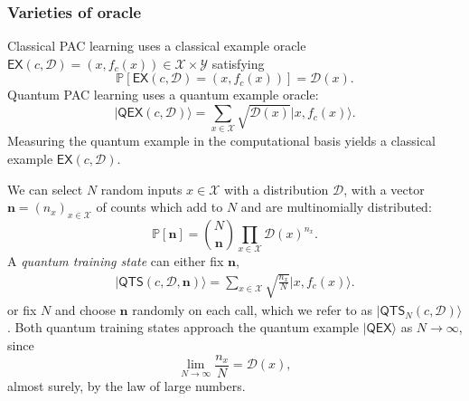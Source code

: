 \documentclass[aps, pre,reprint,nofootinbib,citeautoscript,floatfix]{revtex4-1}
\begin{document}
\subsubsection*{Varieties of oracle}
\label{sec:varieties-oracle}

Classical PAC learning uses a classical example oracle $\mathsf{EX}(c,
\mathcal{D}) = (x, f_c(x)) \in \mathcal{X}\times \mathcal{Y}$ satisfying
\begin{equation}
  \mathbb{P}[\mathsf{EX}(c, \mathcal{D}) = (x, f_c(x))] = \mathcal{D}(x).
\end{equation}
Quantum PAC learning uses a quantum example oracle:
\begin{equation}
  \label{eq:qex2}
  \big|\mathsf{QEX}(c, {\mathcal{D}})\big\rangle = \sum_{x\in
    \mathcal{X}}\sqrt{\mathcal{D}(x)}|x, f_c(x)\rangle.
\end{equation}
Measuring the quantum example in the computational basis yields a classical
example $\mathsf{EX}(c, \mathcal{D})$.

We can select $N$ random inputs $x\in \mathcal{X}$ with a
distribution $\mathcal{D}$, with a vector $\mathbf{n} = (n_x)_{x\in
  \mathcal{X}}$ of counts which add to $N$ and are multinomially distributed:
  \begin{equation}
\mathbb{P}[\mathbf{n}] =
  \binom{N}{\mathbf{n}}\prod_{x\in\mathcal{X}} \mathcal{D}(x)^{n_x}.\label{eq:88}
\end{equation}
A \emph{quantum training state} can either fix $\mathbf{n}$,
\begin{align}
  \label{eq:QTS}
  \big|\mathsf{QTS}(c, {\mathcal{D}}, \mathbf{n})\big\rangle = \sum_{x
  \in\mathcal{X}} \sqrt{\frac{n_x}{N}} |x, f_c(x)\rangle.
\end{align}
or fix $N$ and choose $\mathbf{n}$ randomly on each call, which we
refer to as $\big|\mathsf{QTS}_N(c, {\mathcal{D}})\big\rangle$.
Both quantum training states approach the quantum example
$|\textsf{QEX}\rangle$ as $N \to \infty$, since
\begin{equation}
  \label{eq:lln}
  \lim_{N\to \infty} \frac{n_x}{N} = \mathcal{D}(x),
\end{equation}
almost surely, by the law of large numbers.

\end{document}
